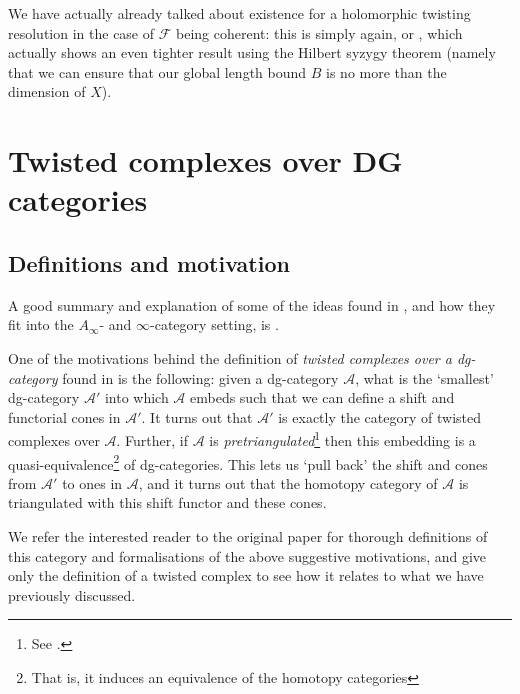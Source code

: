 \documentclass[11pt,notitlepage]{article}
\numberwithin{equation}{subsection}
\begin{document}
                \begin{note}
                    We have actually already talked about existence for a holomorphic twisting resolution in the case of $\mathcal{F}$ being coherent: this is simply \cite[Lemma~8.13]{Toledo:1976gy} again, or \cite[Lemma~2.4]{Toledo:1978tq}, which actually shows an even tighter result using the Hilbert syzygy theorem (namely that we can ensure that our global length bound $B$ is no more than the dimension of $X$).
                \end{note}


        \section{Twisted complexes over DG categories}\label{sec:dg-categories}

            \subsection{Definitions and motivation}

                A good summary and explanation of some of the ideas found in \cite{Bondal:1991un}, and how they fit into the $A_\infty$- and $\infty$-category setting, is \cite[§4]{Faonte:2015vc}.

                \bigskip

                One of the motivations behind the definition of \emph{twisted complexes over a dg-category} found in \cite{Bondal:1991un} is the following: given a dg-category $\mathcal{A}$, what is the `smallest' dg-category $\mathcal{A'}$ into which $\mathcal{A}$ embeds such that we can define a shift and functorial cones in $\mathcal{A'}$.
                It turns out that $\mathcal{A'}$ is exactly the category of twisted complexes over $\mathcal{A}$.
                Further, if $\mathcal{A}$ is \emph{pretriangulated}\footnote{See \cite[§1]{Bondal:1991un}.} then this embedding is a quasi-equivalence\footnote{That is, it induces an equivalence of the homotopy categories} of dg-categories.
                This lets us `pull back' the shift and cones from $\mathcal{A'}$ to ones in $\mathcal{A}$, and it turns out that the homotopy category of $\mathcal{A}$ is triangulated with this shift functor and these cones.

                We refer the interested reader to the original paper for thorough definitions of this category and formalisations of the above suggestive motivations, and give only the definition of a twisted complex to see how it relates to what we have previously discussed.
\end{document}
